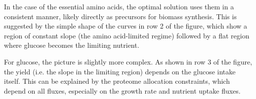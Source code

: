 \documentclass[11pt, letterpaper]{article}
\begin{document}
In the case of the essential amino acids, the optimal solution uses them in a consistent manner, likely directly as precursors for biomass synthesis. 
This is suggested by the simple shape of the curves in row 2 of the figure, which show a region of constant slope (the amino acid-limited regime) followed by a flat region where glucose becomes the limiting nutrient.

For glucose, the picture is slightly more complex.
As shown in row 3 of the figure, the yield (i.e. the slope in the limiting region) depends on the glucose intake itself. 
This can be explained by the proteome allocation constraints, which depend on all fluxes, especially on the growth rate and nutrient uptake fluxes.



	
\end{document}
